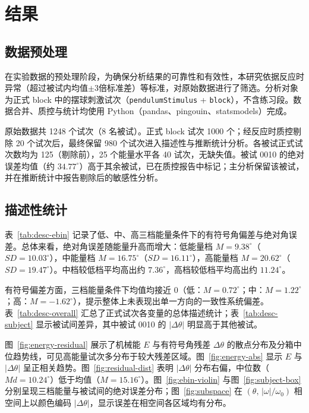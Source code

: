 \section{结果}

\subsection{数据预处理}

在实验数据的预处理阶段，为确保分析结果的可靠性和有效性，本研究依据反应时异常（超过被试内均值$\pm 3$倍标准差）等标准，对原始数据进行了筛选。分析对象为正式 block 中的摆球刺激试次（\texttt{pendulumStimulus} + \texttt{block}），不含练习段。数据合并、质控与统计均使用 Python（pandas、pingouin、statsmodels）完成。

原始数据共 1248 个试次（8 名被试）。正式 block 试次 1000 个；经反应时质控剔除 20 个试次后，最终保留 980 个试次进入描述性与推断统计分析。各被试正式试次数均为 125（剔除前），25 个能量水平各 40 试次，无缺失值。被试 0010 的绝对误差均值（约 $34.77^\circ$）高于其余被试，已在质控报告中标记；主分析保留该被试，并在推断统计中报告剔除后的敏感性分析。

\subsection{描述性统计}

表~\ref{tab:desc-ebin} 记录了低、中、高三档能量条件下的有符号角偏差与绝对角误差。总体来看，绝对角误差随能量升高而增大：低能量档 $M = 9.38^\circ$（$SD = 10.03^\circ$），中能量档 $M = 16.75^\circ$（$SD = 16.11^\circ$），高能量档 $M = 20.62^\circ$（$SD = 19.47^\circ$）。中档较低档平均高出约 $7.36^\circ$，高档较低档平均高出约 $11.24^\circ$。

有符号偏差方面，三档能量条件下均值均接近 0（低：$M = 0.72^\circ$；中：$M = 1.22^\circ$；高：$M = -1.62^\circ$），提示整体上未表现出单一方向的一致性系统偏差。表~\ref{tab:desc-overall} 汇总了正式试次各变量的总体描述统计；表~\ref{tab:desc-subject} 显示被试间差异，其中被试 0010 的 $|{\Delta\theta}|$ 明显高于其他被试。





图~\ref{fig:energy-residual} 展示了机械能 $E$ 与有符号角残差 $\Delta\theta$ 的散点分布及分箱中位趋势线，可见高能量试次多分布于较大残差区域。图~\ref{fig:energy-abs} 显示 $E$ 与 $|{\Delta\theta}|$ 呈正相关趋势。图~\ref{fig:residual-dist} 表明 $|{\Delta\theta}|$ 分布右偏，中位数（$Md = 10.24^\circ$）低于均值（$M = 15.16^\circ$）。图~\ref{fig:ebin-violin} 与图~\ref{fig:subject-box} 分别呈现三档能量与被试间的绝对误差分布；图~\ref{fig:subspace} 在 $(\theta,\,|\omega|/\omega_0)$ 相空间上以颜色编码 $|{\Delta\theta}|$，显示误差在相空间各区域均有分布。

